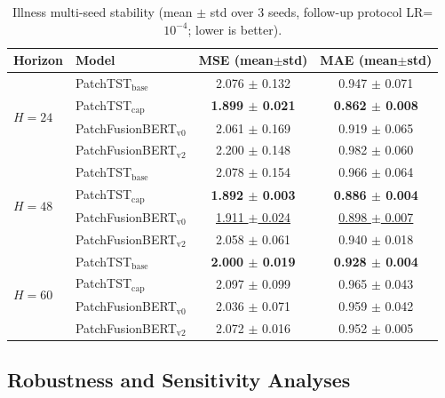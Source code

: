 \documentclass{ieeeaccess}
\newcommand{\modelvzero}{PatchFusionBERT$_{\text{v0}}$\xspace}
\newcommand{\modelvtwo}{PatchFusionBERT$_{\text{v2}}$\xspace}
\begin{document}
\begin{table}[t]
\centering
\caption{Illness multi-seed stability (mean $\pm$ std over 3 seeds,
follow-up protocol LR=$10^{-4}$; lower is better).}
\label{tab:app_illness_multiseed}
{\small
\setlength{\tabcolsep}{10pt}
\renewcommand{\arraystretch}{1.12}
\begin{tabular}{@{}llcc@{}}
\toprule
Horizon & Model & MSE (mean$\pm$std) & MAE (mean$\pm$std) \\
\midrule
\multirow{4}{*}{$H=24$}
& PatchTST$_\text{base}$ & 2.076 $\pm$ 0.132 & 0.947 $\pm$ 0.071 \\
& PatchTST$_\text{cap}$  & \textbf{1.899 $\pm$ 0.021} & \textbf{0.862 $\pm$ 0.008} \\
& \modelvzero             & 2.061 $\pm$ 0.169 & 0.919 $\pm$ 0.065 \\
& \modelvtwo              & 2.200 $\pm$ 0.148 & 0.982 $\pm$ 0.060 \\
\midrule
\multirow{4}{*}{$H=48$}
& PatchTST$_\text{base}$ & 2.078 $\pm$ 0.154 & 0.966 $\pm$ 0.064 \\
& PatchTST$_\text{cap}$  & \textbf{1.892 $\pm$ 0.003} & \textbf{0.886 $\pm$ 0.004} \\
& \modelvzero             & \underline{1.911 $\pm$ 0.024} & \underline{0.898 $\pm$ 0.007} \\
& \modelvtwo              & 2.058 $\pm$ 0.061 & 0.940 $\pm$ 0.018 \\
\midrule
\multirow{4}{*}{$H=60$}
& PatchTST$_\text{base}$ & \textbf{2.000 $\pm$ 0.019} & \textbf{0.928 $\pm$ 0.004} \\
& PatchTST$_\text{cap}$  & 2.097 $\pm$ 0.099 & 0.965 $\pm$ 0.043 \\
& \modelvzero             & 2.036 $\pm$ 0.071 & 0.959 $\pm$ 0.042 \\
& \modelvtwo              & 2.072 $\pm$ 0.016 & 0.952 $\pm$ 0.005 \\
\bottomrule
\end{tabular}
}
\end{table}

\FloatBarrier

\subsection{Robustness and Sensitivity Analyses}
\end{document}
